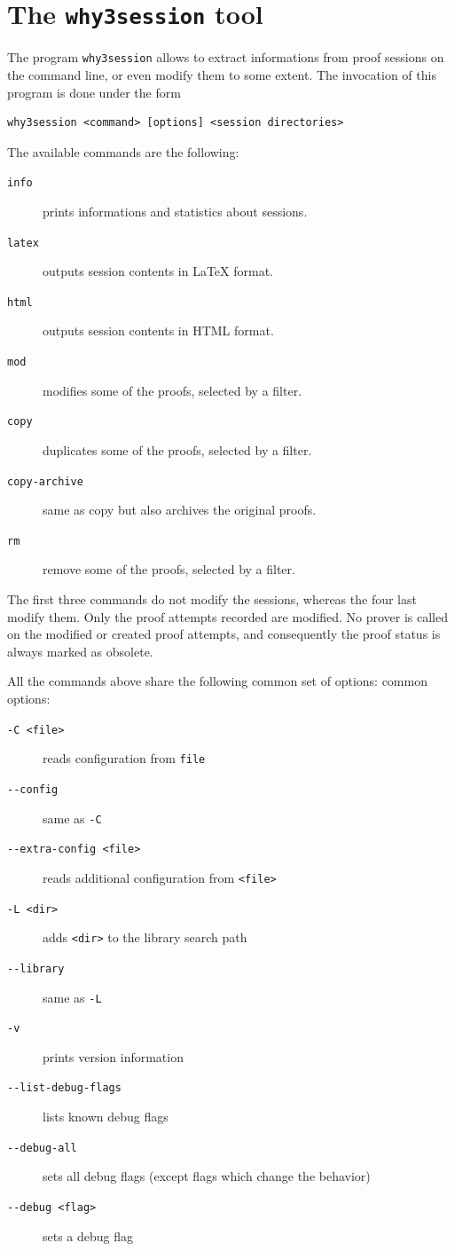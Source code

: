 \section{The \texttt{why3session} tool}
\label{sec:why3session}

The program \texttt{why3session} allows to extract informations from
proof sessions on the command line, or even modify them to some
extent. The invocation of this program is done under the form
\begin{verbatim}
why3session <command> [options] <session directories>
\end{verbatim}
The available commands are the following:
\begin{description}
\item[\texttt{info}] prints informations and statistics about sessions.
\item[\texttt{latex}] outputs session contents in LaTeX format.
\item[\texttt{html}] outputs session contents in HTML format.
\item[\texttt{mod}] modifies some of the proofs, selected by a filter.
\item[\texttt{copy}] duplicates some of the proofs, selected by a filter.
\item[\texttt{copy-archive}] same as copy but also archives the
  original proofs.
\item[\texttt{rm}] remove some of the proofs, selected by a filter.
\end{description}

The first three commands do not modify the sessions, whereas the four
last modify them. Only the proof attempts recorded are modified. No
prover is called on the modified or created proof attempts, and
consequently the proof status is always marked as obsolete.

All the commands above share the following common set of options:
common options:
\begin{description}
\item[\texttt{-C <file>}] reads configuration from \texttt{file}
\item[\texttt{-{}-config}]  same as \texttt{-C}
\item[\texttt{-{}-extra-config <file>}] reads additional configuration from \texttt{<file>}
\item[\texttt{-L <dir>}]              adds \texttt{<dir>} to the library search path
\item[\texttt{-{}-library}]             same as \texttt{-L}
\item[\texttt{-v}]                    prints version information
\item[\texttt{-{}-list-debug-flags}]    lists known debug flags
\item[\texttt{-{}-debug-all}]           sets all debug flags (except flags which change the behavior)
\item[\texttt{-{}-debug <flag>}]        sets a debug flag
\end{description}

